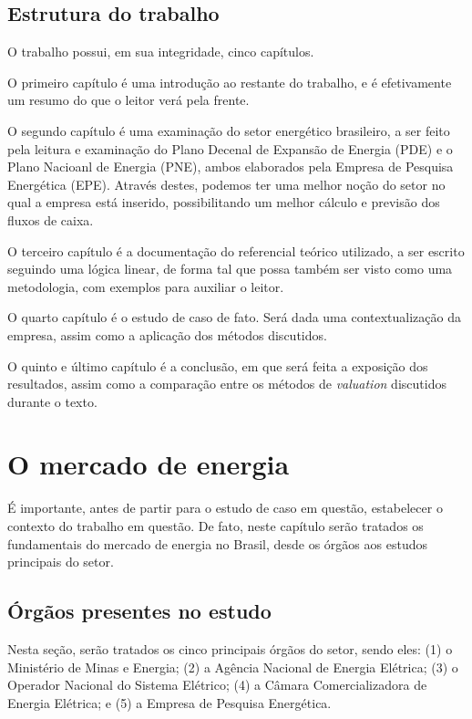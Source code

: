 \documentclass[grad,numbers]{coppe}
\begin{document}
  \hypertarget{estrutura-do-trabalho}{%
  \section{Estrutura do trabalho}\label{estrutura-do-trabalho}}

  O trabalho possui, em sua integridade, cinco capítulos.

  O primeiro capítulo é uma introdução ao restante do trabalho, e é efetivamente um resumo do que o leitor verá pela frente.

  O segundo capítulo é uma examinação do setor energético brasileiro, a ser feito pela leitura e examinação do Plano Decenal de Expansão de Energia (PDE) e o Plano Nacioanl de Energia (PNE), ambos elaborados pela Empresa de Pesquisa Energética (EPE). Através destes, podemos ter uma melhor noção do setor no qual a empresa está inserido, possibilitando um melhor cálculo e previsão dos fluxos de caixa.

  O terceiro capítulo é a documentação do referencial teórico utilizado, a ser escrito seguindo uma lógica linear, de forma tal que possa também ser visto como uma metodologia, com exemplos para auxiliar o leitor.

  O quarto capítulo é o estudo de caso de fato. Será dada uma contextualização da empresa, assim como a aplicação dos métodos discutidos.

  O quinto e último capítulo é a conclusão, em que será feita a exposição dos resultados, assim como a comparação entre os métodos de \emph{valuation} discutidos durante o texto.

  \hypertarget{o-mercado-de-energia}{%
  \chapter{O mercado de energia}\label{o-mercado-de-energia}}

  É importante, antes de partir para o estudo de caso em questão, estabelecer o contexto do trabalho em questão. De fato, neste capítulo serão tratados os fundamentais do mercado de energia no Brasil, desde os órgãos aos estudos principais do setor.

  \hypertarget{uxf3rguxe3os-presentes-no-estudo}{%
  \section{Órgãos presentes no estudo}\label{uxf3rguxe3os-presentes-no-estudo}}

  Nesta seção, serão tratados os cinco principais órgãos do setor, sendo eles: (1) o Ministério de Minas e Energia; (2) a Agência Nacional de Energia Elétrica; (3) o Operador Nacional do Sistema Elétrico; (4) a Câmara Comercializadora de Energia Elétrica; e (5) a Empresa de Pesquisa Energética.
\end{document}

